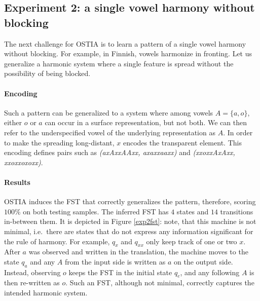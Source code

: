 \subsection{Experiment 2: a single vowel harmony without blocking}

The next challenge for OSTIA is to learn a pattern of a single vowel harmony without blocking.
For example, in Finnish, vowels harmonize in fronting.
Let us generalize a harmonic system where a single feature is spread without the possibility of being blocked.


\paragraph{Encoding}

Such a pattern can be generalized to a system where among vowels $A = \{a, o\}$, either $o$ or $a$ can occur in a surface representation, but not both.
We can then refer to the underspecified vowel of the underlying representation as $A$.
In order to make the spreading long-distant, $x$ encodes the transparent element.
This encoding defines pairs such as \emph{(axAxxAAxx, axaxxaaxx)} and \emph{(xxoxxAxAxx, xxoxxoxoxx)}.


\paragraph{Results}

OSTIA induces the FST that correctly generalizes the pattern, therefore, scoring $100$\% on both testing samples.
The inferred FST has $4$ states and $14$ transitions in-between them.
It is depicted in Figure \ref{exp2fst}: note, that this machine is not minimal, i.e.\ there are states that do not express any information significant for the rule of harmony.
For example, $q_{x}$ and $q_{xx}$ only keep track of one or two $x$.
After $a$ was observed and written in the translation, the machine moves to the state $q_{a}$ and any $A$ from the input side is written as $a$ on the output side.
Instead, observing $o$ keeps the FST in the initial state $q_{e}$, and any following $A$ is then re-written as $o$.
Such an FST, although not minimal, correctly captures the intended harmonic system.

